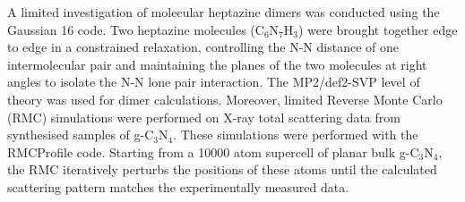 A limited investigation of molecular heptazine dimers was conducted using the Gaussian 16 code.\cite{Frisch2016GaussianC.01}  
Two heptazine molecules (C$_6$N$_7$H$_3$) were brought together edge to edge in a constrained relaxation, controlling the N-N distance of one intermolecular pair and maintaining the planes of the two molecules at right angles to isolate the N-N lone pair interaction. The MP2/def2-SVP level of theory was used for dimer calculations.
Moreover, limited Reverse Monte Carlo (RMC) simulations were performed on X-ray total scattering data from synthesised samples of g-C$_3$N$_4$.\cite{Adnan2026atomicallycoordinatednonmetal}  These simulations were performed with the RMCProfile code.\cite{Tucker2007RMCProfile:Materials,Liu2025HarnessingCapacitors,Wang2025RegulatedFixation}
Starting from a 10000 atom supercell of planar bulk g-C$_3$N$_4$, the RMC iteratively perturbs the positions of these atoms until the calculated scattering pattern matches the experimentally measured data.